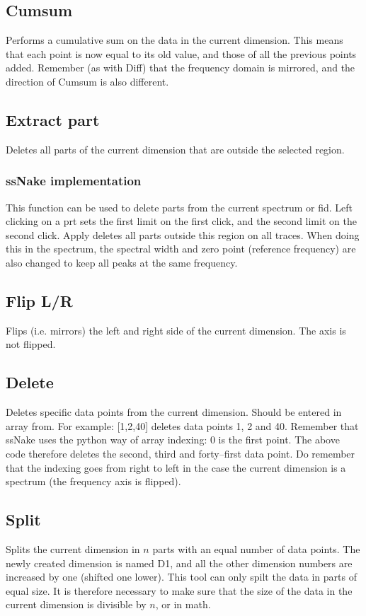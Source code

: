 \documentclass[11pt,a4paper]{article}
\begin{document}
\subsection{Cumsum}
Performs a cumulative sum on the data in the current dimension. This means that each point is now equal to its old value, and those of all the previous points added. Remember (as with Diff) that the frequency domain is mirrored, and the direction of Cumsum is also different.


\subsection{Extract part}
Deletes all parts of the current dimension that are outside the selected region.


\subsubsection*{ssNake implementation}
This function can be used to delete parts from the current spectrum or fid. Left clicking on a prt sets the first limit on the first click, and the second limit on the second click. Apply deletes all parts outside this region on all traces. When doing this in the spectrum, the spectral width and zero point (reference frequency) are also changed to keep all peaks at the same frequency.

\subsection{Flip L/R}
Flips (i.e. mirrors) the left and right side of the current dimension. The axis is not flipped.

\subsection{Delete}
Deletes specific data points from the current dimension. Should be entered in array from. For example: [1,2,40] deletes data points 1, 2 and 40. Remember that ssNake uses the python way of array indexing: 0 is the first point. The above code therefore deletes the second, third and forty--first data point. Do remember that the indexing goes from right to left in the case the current dimension is a spectrum (the frequency axis is flipped).

\subsection{Split}
Splits the current dimension in $n$ parts with an equal number of data points. The newly created dimension is named D1, and all the other dimension numbers are increased by one (shifted one lower). This tool can only spilt the data in parts of equal size. It is therefore necessary to make sure that the size of the data in the current dimension is divisible by $n$, or in math.
\end{document}
